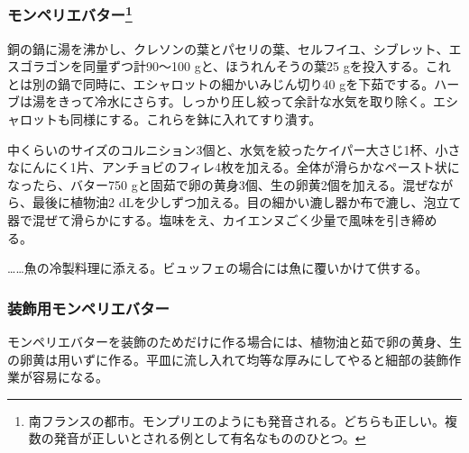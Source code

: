 \begin{recette}
\hypertarget{beurre-de-montpellier}{%
\subsubsection[モンペリエバター]{\texorpdfstring{モンペリエバター\footnote{南フランスの都市。モンプリエのようにも発音される。どちらも正しい。複数の発音が正しいとされる例として有名なもののひとつ。}}{モンペリエバター}}\label{beurre-de-montpellier}}



銅の鍋に湯を沸かし、クレソンの葉とパセリの葉、セルフイユ、シブレット、エスゴラゴンを同量ずつ計90〜100
gと、ほうれんそうの葉25
gを投入する。これとは別の鍋で同時に、エシャロットの細かいみじん切り40
gを下茹でする。ハーブは湯をきって冷水にさらす。しっかり圧し絞って余計な水気を取り除く。エシャロットも同様にする。これらを鉢に入れてすり潰す。

中くらいのサイズのコルニション3個と、水気を絞ったケイパー大さじ1杯、小さなにんにく1片、アンチョビのフィレ4枚を加える。全体が滑らかなペースト状になったら、バター750
gと固茹で卵の黄身3個、生の卵黄2個を加える。混ぜながら、最後に植物油2
dLを少しずつ加える。目の細かい漉し器か布で漉し、泡立て器で混ぜて滑らかにする。塩味をえ、カイエンヌごく少量で風味を引き締める。

\ldots{}\ldots{}魚の冷製料理に添える。ビュッフェの場合には魚に覆いかけて供する。

\hypertarget{beurre-de-montpellier-pour-croutonnage-de-plats}{%
\subsubsection{装飾用モンペリエバター}\label{beurre-de-montpellier-pour-croutonnage-de-plats}}



モンペリエバターを装飾のためだけに作る場合には、植物油と茹で卵の黄身、生の卵黄は用いずに作る。平皿に流し入れて均等な厚みにしてやると細部の装飾作業が容易になる。


\end{recette}

